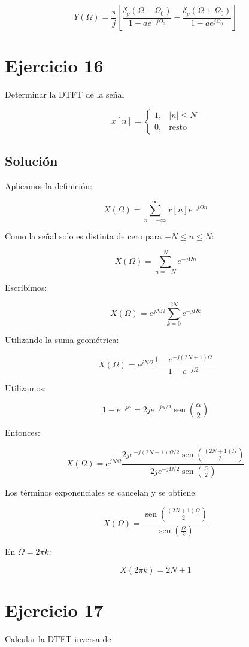 \documentclass[fleqn]{article}
\DeclareMathOperator{\sen}{sen}
\begin{document}
	\[
	\boxed{
	Y(\Omega)
	=
	\frac{\pi}{j}
	\left[
	\frac{
	\delta_p(\Omega-\Omega_0)
	}{
	1-ae^{-j\Omega_0}
	}
	-
	\frac{
	\delta_p(\Omega+\Omega_0)
	}{
	1-ae^{j\Omega_0}
	}
	\right]
	}
	\]

\section{Ejercicio 16}
	Determinar la DTFT de la señal

	\[
	x[n]=
	\begin{cases}
	1, & |n|\leq N \\[1mm]
	0, & \text{resto}
	\end{cases}
	\]

	\subsection{Solución}

	Aplicamos la definición:

	\[
	X(\Omega)
	=
	\sum_{n=-\infty}^{\infty}
	x[n]e^{-j\Omega n}
	\]

	Como la señal solo es distinta de cero para $-N\leq n\leq N$:

	\[
	X(\Omega)
	=
	\sum_{n=-N}^{N}
	e^{-j\Omega n}
	\]

	Escribimos:

	\[
	X(\Omega)
	=
	e^{jN\Omega}
	\sum_{k=0}^{2N}
	e^{-j\Omega k}
	\]

	Utilizando la suma geométrica:

	\[
	X(\Omega)
	=
	e^{jN\Omega}
	\frac{
	1-e^{-j(2N+1)\Omega}
	}{
	1-e^{-j\Omega}
	}
	\]

	Utilizamos:

	\[
	1-e^{-j\alpha}
	=
	2je^{-j\alpha/2}
	\sen\left(\frac{\alpha}{2}\right)
	\]

	Entonces:

	\[
	X(\Omega)
	=
	e^{jN\Omega}
	\frac{
	2je^{-j(2N+1)\Omega/2}
	\sen\left(\frac{(2N+1)\Omega}{2}\right)
	}{
	2je^{-j\Omega/2}
	\sen\left(\frac{\Omega}{2}\right)
	}
	\]

	Los términos exponenciales se cancelan y se obtiene:

	\[
	\boxed{
	X(\Omega)
	=
	\frac{
	\sen\left(\frac{(2N+1)\Omega}{2}\right)
	}{
	\sen\left(\frac{\Omega}{2}\right)
	}
	}
	\]

	En $\Omega=2\pi k$:

	\[
	\boxed{
	X(2\pi k)=2N+1
	}
	\]

\section{Ejercicio 17}
	Calcular la DTFT inversa de
\end{document}
